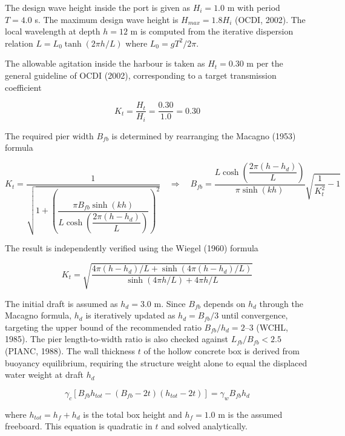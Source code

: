 \documentclass[a4paper, 11pt]{article}
\begin{document}
\hspace*{0.5cm} The design wave height inside the port is given as $H_i = 1.0$ m with period $T = 4.0$ s. The maximum design wave height is $H_{max} = 1.8H_i$ (OCDI, 2002). The local wavelength at depth $h = 12$ m is computed from the iterative dispersion relation $L = L_0\tanh(2\pi h/L)$ where $L_0 = gT^2/2\pi$.

The allowable agitation inside the harbour is taken as $H_t = 0.30$ m per the general guideline of OCDI (2002), corresponding to a target transmission coefficient

\begin{equation}
    K_t = \frac{H_t}{H_i} = \frac{0.30}{1.0} = 0.30
\end{equation}

The required pier width $B_{fb}$ is determined by rearranging the Macagno (1953) formula

\begin{equation}
    K_t = \frac{1}{\sqrt{1 + \left(\dfrac{\pi B_{fb} \sinh(kh)}{L\cosh\!\left(\dfrac{2\pi(h-h_d)}{L}\right)}\right)^2}}
    \quad \Rightarrow \quad
    B_{fb} = \frac{L\cosh\!\left(\dfrac{2\pi(h-h_d)}{L}\right)}{\pi\sinh(kh)}\sqrt{\frac{1}{K_t^2}-1}
\end{equation}

The result is independently verified using the Wiegel (1960) formula

\begin{equation}
    K_t = \sqrt{\frac{4\pi(h-h_d)/L + \sinh\!\left(4\pi(h-h_d)/L\right)}{\sinh(4\pi h/L) + 4\pi h/L}}
\end{equation}

The initial draft is assumed as $h_d = 3.0$ m. Since $B_{fb}$ depends on $h_d$ through the Macagno formula, $h_d$ is iteratively updated as $h_d = B_{fb}/3$ until convergence, targeting the upper bound of the recommended ratio $B_{fb}/h_d = 2$--$3$ (WCHL, 1985). The pier length-to-width ratio is also checked against $L_{fb}/B_{fb} < 2.5$ (PIANC, 1988). The wall thickness $t$ of the hollow concrete box is derived from buoyancy equilibrium, requiring the structure weight alone to equal the displaced water weight at draft $h_d$

\begin{equation}
    \gamma_c\left[B_{fb}h_{tot} - (B_{fb}-2t)(h_{tot}-2t)\right] = \gamma_w B_{fb} h_d
\end{equation}

where $h_{tot} = h_f + h_d$ is the total box height and $h_f = 1.0$ m is the assumed freeboard. This equation is quadratic in $t$ and solved analytically.
\end{document}
